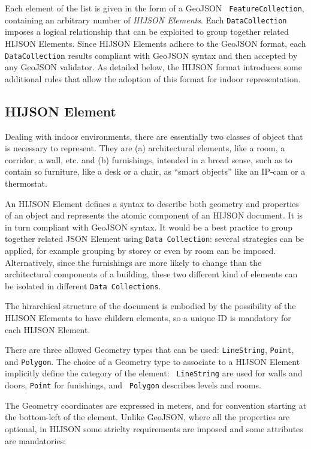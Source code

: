 Each element of the list is given in the form of a GeoJSON {\tt
FeatureCollection}, containing an arbitrary  number of \emph{HIJSON Elements}.
Each {\tt DataCollection} imposes a logical relationship that can be exploited
to group together related HIJSON Elements. Since  HIJSON Elements adhere to
the GeoJSON format, each {\tt DataCollectio}n results compliant with GeoJSON
syntax and then accepted by any GeoJSON validator. As detailed below, the
HIJSON format  introduces some additional rules that allow the adoption of
this format for indoor representation.


\subsection{HIJSON Element}

Dealing with indoor environments, there are essentially two classes of object
that is necessary to represent. They are (a) architectural elements, like a
room, a corridor, a wall, etc. and (b) furnishings, intended in a broad sense,
such as to contain so furniture, like a desk or a chair, as ``smart objects''
like an IP-cam or a thermostat.

An HIJSON Element defines a syntax to describe both geometry and properties of
an object and represents the atomic component of an HIJSON document. It is in
turn compliant with GeoJSON syntax. It would be a best practice to group
together related JSON Element using {\tt Data Collection}: several strategies
can be applied, for example grouping by storey or even by room can be imposed.
Alternatively, since the furnishings are more likely to change than the
architectural components of a building, these two different kind of elements
can be isolated in different {\tt Data Collections}.

The hirarchical structure of the document is embodied by the possibility of the HIJSON Elements to have childern elements, so a unique ID is mandatory for each HIJSON Element. 

There are three allowed Geometry types that can be used: {\tt LineString},
{\tt Point}, and {\tt Polygon}. The choice of a Geometry type to associate to
a HIJSON Element implicitly define the category of the element: {\tt
LineString} are used for walls and doors, {\tt Point} for funishings, and {\tt
Polygon} describes levels and rooms.

The Geometry coordinates are expressed in meters, and for convention starting
at the bottom-left of the element. Unlike GeoJSON, where all the properties
are optional, in HIJSON some striclty requirements are imposed and some
attributes are mandatories:

